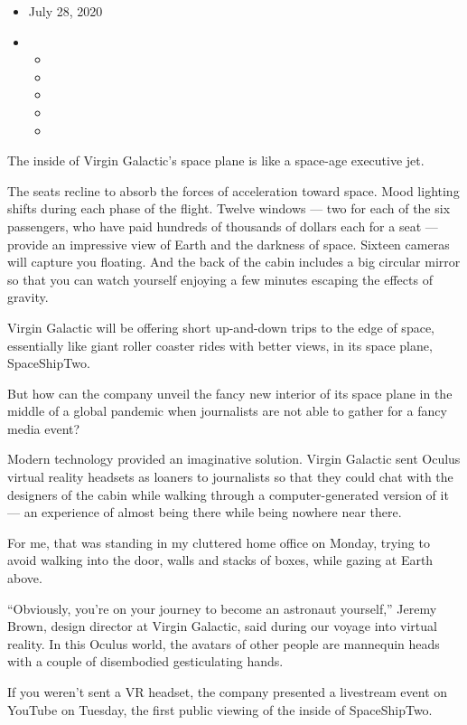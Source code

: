 \begin{itemize}
\item
  July 28, 2020
\item
  \begin{itemize}
  \item
  \item
  \item
  \item
  \item
  \end{itemize}
\end{itemize}

The inside of Virgin Galactic's space plane is like a space-age
executive jet.

The seats recline to absorb the forces of acceleration toward space.
Mood lighting shifts during each phase of the flight. Twelve windows ---
two for each of the six passengers, who have paid hundreds of thousands
of dollars each for a seat --- provide an impressive view of Earth and
the darkness of space. Sixteen cameras will capture you floating. And
the back of the cabin includes a big circular mirror so that you can
watch yourself enjoying a few minutes escaping the effects of gravity.

Virgin Galactic will be offering short up-and-down trips to the edge of
space, essentially like giant roller coaster rides with better views, in
its space plane, SpaceShipTwo.

But how can the company unveil the fancy new interior of its space plane
in the middle of a global pandemic when journalists are not able to
gather for a fancy media event?

Modern technology provided an imaginative solution. Virgin Galactic sent
Oculus virtual reality headsets as loaners to journalists so that they
could chat with the designers of the cabin while walking through a
computer-generated version of it --- an experience of almost being there
while being nowhere near there.

For me, that was standing in my cluttered home office on Monday, trying
to avoid walking into the door, walls and stacks of boxes, while gazing
at Earth above.

``Obviously, you're on your journey to become an astronaut yourself,''
Jeremy Brown, design director at Virgin Galactic, said during our voyage
into virtual reality. In this Oculus world, the avatars of other people
are mannequin heads with a couple of disembodied gesticulating hands.

If you weren't sent a VR headset, the company presented a livestream
event on YouTube on Tuesday, the first public viewing of the inside of
SpaceShipTwo.

